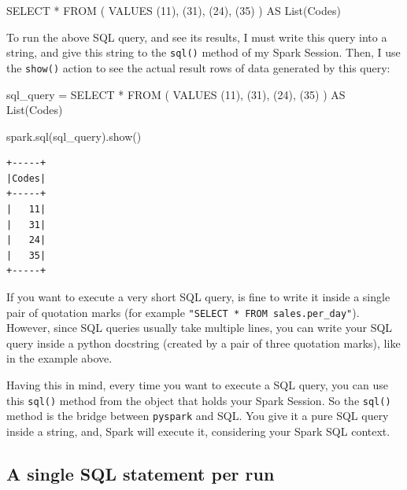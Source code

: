 \documentclass[
  11pt,
  letterpaper,
  DIV=11,
  numbers=noendperiod]{scrreprt}
\newenvironment{Shaded}{\begin{snugshade}}{\end{snugshade}}
\newcommand{\DecValTok}[1]{\textcolor[rgb]{0.68,0.00,0.00}{#1}}
\newcommand{\KeywordTok}[1]{\textcolor[rgb]{0.00,0.23,0.31}{#1}}
\newcommand{\NormalTok}[1]{\textcolor[rgb]{0.00,0.23,0.31}{#1}}
\newcommand{\OperatorTok}[1]{\textcolor[rgb]{0.37,0.37,0.37}{#1}}
\newcommand{\StringTok}[1]{\textcolor[rgb]{0.13,0.47,0.30}{#1}}
\begin{document}
\begin{Shaded}
\begin{Highlighting}[]
\KeywordTok{SELECT} \OperatorTok{*}
\KeywordTok{FROM}\NormalTok{ (}
  \KeywordTok{VALUES}\NormalTok{ (}\DecValTok{11}\NormalTok{), (}\DecValTok{31}\NormalTok{), (}\DecValTok{24}\NormalTok{), (}\DecValTok{35}\NormalTok{)}
\NormalTok{) }\KeywordTok{AS} \KeywordTok{List}\NormalTok{(Codes)}
\end{Highlighting}
\end{Shaded}

To run the above SQL query, and see its results, I must write this query
into a string, and give this string to the \texttt{sql()} method of my
Spark Session. Then, I use the \texttt{show()} action to see the actual
result rows of data generated by this query:

\begin{Shaded}
\begin{Highlighting}[]
\NormalTok{sql\_query }\OperatorTok{=} \StringTok{\textquotesingle{}\textquotesingle{}\textquotesingle{}}
\StringTok{SELECT *}
\StringTok{FROM (}
\StringTok{  VALUES (11), (31), (24), (35)}
\StringTok{) AS List(Codes)}
\StringTok{\textquotesingle{}\textquotesingle{}\textquotesingle{}}

\NormalTok{spark.sql(sql\_query).show()}
\end{Highlighting}
\end{Shaded}

\begin{verbatim}
+-----+
|Codes|
+-----+
|   11|
|   31|
|   24|
|   35|
+-----+
\end{verbatim}

If you want to execute a very short SQL query, is fine to write it
inside a single pair of quotation marks (for example
\texttt{"SELECT\ *\ FROM\ sales.per\_day"}). However, since SQL queries
usually take multiple lines, you can write your SQL query inside a
python docstring (created by a pair of three quotation marks), like in
the example above.

Having this in mind, every time you want to execute a SQL query, you can
use this \texttt{sql()} method from the object that holds your Spark
Session. So the \texttt{sql()} method is the bridge between
\texttt{pyspark} and SQL. You give it a pure SQL query inside a string,
and, Spark will execute it, considering your Spark SQL context.

\subsection{A single SQL statement per
run}\label{a-single-sql-statement-per-run}
\end{document}
